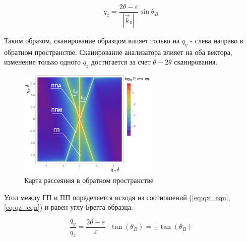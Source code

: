 \begin{equation}
  q_z = \frac{2\theta - \varepsilon}{|\vec{k}_0|} \sin \theta_B
  \label{eq:qz_eqn}
\end{equation}

Таким образом, сканирование образцом влияет только на $q_y$ - слева направо в обратном пространстве.
Сканирование анализатора влияет на оба вектора, изменение только одного $q_z$ достигается за
счет $\theta-2\theta$ сканирования.

\begin{figure}[H]
  \centering
  \includegraphics[width=0.6\textwidth]{images/triple_map_reciprocal_space.png}
  \caption{Карта рассеяния в обратном пространстве}
  \label{ris:triple_map_reciprocal_space}
\end{figure}

Угол между ГП и ПП определяется исходя из соотношений (\ref{eq:qx_eqn}, \ref{eq:qz_eqn}) и равен углу Брегга образца:

\begin{equation}
  \frac{q_y}{q_z} = \frac{2\theta - \varepsilon}{\varepsilon} \cdot \tan (\theta_B) = \pm \tan (\theta_B)
  \label{eq:qz_eqn}
\end{equation}
